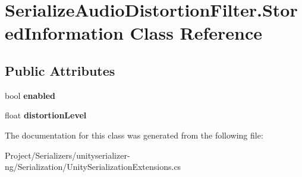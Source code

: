 \hypertarget{class_serialize_audio_distortion_filter_1_1_stored_information}{}\section{Serialize\+Audio\+Distortion\+Filter.\+Stored\+Information Class Reference}
\label{class_serialize_audio_distortion_filter_1_1_stored_information}
\subsection*{Public Attributes}
\begin{DoxyCompactItemize}
\item 
\mbox{\label{class_serialize_audio_distortion_filter_1_1_stored_information_aafbf4022fa143520dd73a6c779fd3340}} 
bool {\bfseries enabled}
\item 
\mbox{\label{class_serialize_audio_distortion_filter_1_1_stored_information_a96ca2c3e3736c0519a044198ae3397b2}} 
float {\bfseries distortion\+Level}
\end{DoxyCompactItemize}


The documentation for this class was generated from the following file\+:\begin{DoxyCompactItemize}
\item 
Project/\+Serializers/unityserializer-\/ng/\+Serialization/Unity\+Serialization\+Extensions.\+cs\end{DoxyCompactItemize}
